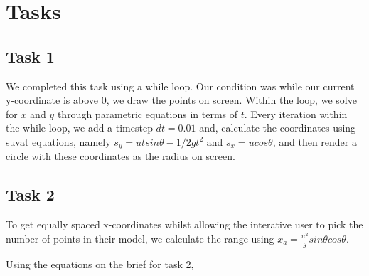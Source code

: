 \documentclass[main.tex]{subfiles}
\begin{document}
 
\section{Tasks}
\subsection{Task 1}
We completed this task using a while loop. Our condition was while our current y-coordinate is above 0, we draw the points on screen. Within the loop, we solve for $x$ and $y$ through parametric equations in terms of $t$. Every iteration within the while loop, we add a timestep $dt = 0.01$ and, calculate the coordinates using suvat equations, namely $s_y = u tsin\theta  - 1/2 g t^2$ and $s_x = u cos\theta$, and then render a circle with these coordinates as the radius on screen.

\subsection{Task 2}
To get equally spaced x-coordinates whilst allowing the interative user to pick the number of points in their model, we calculate the range using $x_a = \frac{u^2}{g} sin\theta cos\theta$.


Using the equations on the brief \cite{brief} for task 2,
\end{document}
